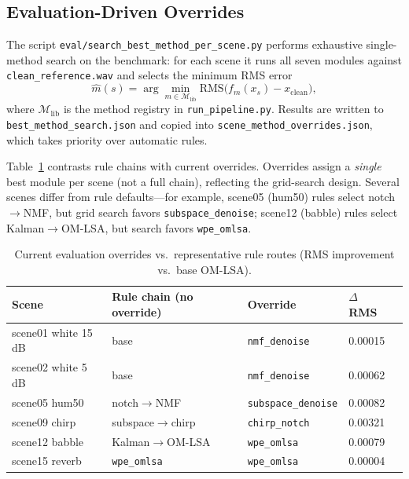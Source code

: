 \subsection{Evaluation-Driven Overrides}

The script \texttt{eval/search\_best\_method\_per\_scene.py} performs exhaustive single-method search on the benchmark: for each scene it runs all seven modules against \texttt{clean\_reference.wav} and selects the minimum RMS error
\begin{equation}
  \hat{m}(s) = \arg\min_{m\in\mathcal{M}_{\mathrm{lib}}} \mathrm{RMS}\bigl(f_m(x_s)-x_{\mathrm{clean}}\bigr),
\end{equation}
where $\mathcal{M}_{\mathrm{lib}}$ is the method registry in \texttt{run\_pipeline.py}. Results are written to \texttt{best\_method\_search.json} and copied into \texttt{scene\_method\_overrides.json}, which takes priority over automatic rules.

Table~\ref{tab:override_vs_rules} contrasts rule chains with current overrides. Overrides assign a \emph{single} best module per scene (not a full chain), reflecting the grid-search design. Several scenes differ from rule defaults---for example, scene05 (hum50) rules select notch$\rightarrow$NMF, but grid search favors \texttt{subspace\_denoise}; scene12 (babble) rules select Kalman$\rightarrow$OM-LSA, but search favors \texttt{wpe\_omlsa}.

\begin{table}[H]
  \centering
  \caption{Current evaluation overrides vs.\ representative rule routes (RMS improvement vs.\ base OM-LSA).}
  \label{tab:override_vs_rules}
  \footnotesize
  \begin{tabular}{llllr}
    \toprule
    \textbf{Scene} & \textbf{Rule chain (no override)} & \textbf{Override} & $\Delta$RMS \\
    \midrule
    scene01 white 15\,dB  & base & \texttt{nmf\_denoise} & 0.00015 \\
    scene02 white 5\,dB   & base & \texttt{nmf\_denoise} & 0.00062 \\
    scene05 hum50         & notch$\rightarrow$NMF & \texttt{subspace\_denoise} & 0.00082 \\
    scene09 chirp         & subspace$\rightarrow$chirp & \texttt{chirp\_notch} & 0.00321 \\
    scene12 babble        & Kalman$\rightarrow$OM-LSA & \texttt{wpe\_omlsa} & 0.00079 \\
    scene15 reverb        & \texttt{wpe\_omlsa} & \texttt{wpe\_omlsa} & 0.00004 \\
    \bottomrule
  \end{tabular}
\end{table}

